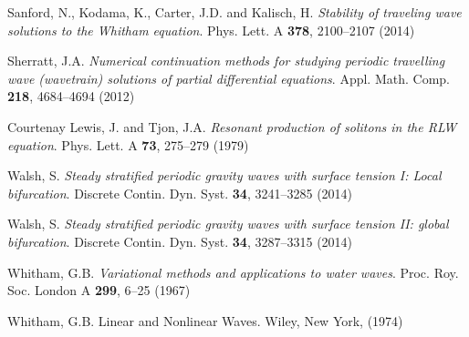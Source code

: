 \begin{thebibliography}{}
Sanford, N., Kodama, K., Carter, J.D. and Kalisch, H. 
{\em Stability of traveling wave solutions to the Whitham equation}. 
Phys. Lett. A \textbf{378}, 2100--2107 (2014)


 Sherratt, J.A. 
{\em Numerical continuation methods for studying periodic travelling wave (wavetrain) 
solutions of partial differential equations}.
Appl. Math. Comp. \textbf{218}, 4684--4694 (2012)


 Courtenay Lewis, J. and Tjon, J.A.
              {\em Resonant production of solitons in the RLW equation}.
              Phys. Lett. A \textbf{73}, 275--279 (1979)



 Walsh, S. 
{\em Steady stratified periodic gravity waves with surface tension I: Local bifurcation}.
Discrete Contin. Dyn. Syst. \textbf{34}, 3241--3285 (2014)



 Walsh, S. 
{\em Steady stratified periodic gravity waves with surface tension II: global bifurcation}. 
Discrete Contin. Dyn. Syst. \textbf{34}, 3287--3315 (2014)



Whitham, G.B. 
{\em Variational methods and applications to water waves}.
Proc. Roy. Soc. London A \textbf{299}, 6--25 (1967)


Whitham, G.B. 
Linear and Nonlinear Waves. Wiley, New York, (1974)



\end{thebibliography}


